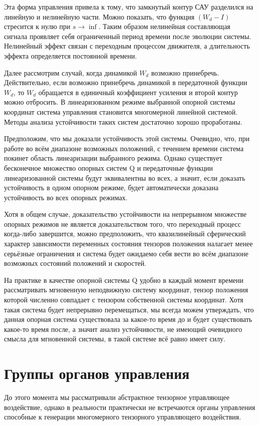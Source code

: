 \documentclass[a4paper]{article}
\begin{document}
Эта форма управления привела к тому, что замкнутый контур САУ разделился на линейную и нелинейную части.
Можно показать, что функция $(W_d - I)$ стресится к нулю при $s \rightarrow \inf$. Таким образом нелинейная составляющая сигнала проявляет себя ограниченный период времени после эволюции системы. Нелинейный эффект связан с переходным процессом движителя, а длительность эффекта определяется постоянной времени.   

Далее рассмотрим случай, когда динамикой $W_d$ возможно принебречь. Действительно, если возможно принебречь динамикой в передаточной функции $W_{d}$, то $W_{d}$ обращается в единичный коэффициент усиления и второй контур можно отбросить. В линеаризованном режиме выбранной опорной системы координат система управления становится многомерной линейной системой. Методы анализа устойчивости таких систем достаточно хорошо проработаны.

Предположим, что мы доказали устойчивость этой системы. Очевидно, что, при работе во всём диапазоне возможных положений, с течением времени система покинет область линеаризации выбранного режима. Однако существует бесконечное множество опорных систем Q и передаточные функции линеаризованной системы будут эквивалентны во всех, а значит, если доказать устойчивость в одном опорном режиме, будет автоматически доказана устойчивость во всех опорных режимах. 

Хотя в общем случае, доказательство устойчивости на непрерывном множестве опорных режимов не является доказательством того, что переходный процесс когда-либо завершится, можно предположить, что квазилинейный сферический характер зависимости переменных состояния тензоров положения налагает менее серьёзные ограничения и система будет ожидаемо себя вести во всём диапазоне возможных состояний положений и скоростей.

На практике в качестве опорной системы Q удобно в каждый момент времени рассматривать мгновенную неподвижную систему координат, тензор положения которой численно совпадает с тензором собственной системы координат. Хотя такая система будет непрерывно перемещаться, мы всегда можем утверждать, что данная опорная система существовала за какое-то время до и будет существовать какое-то время после, а значит анализ устойчивости, не имеющий очевидного смысла для мгновенной системы, в такой системе всё равно имеет силу. 

\section{Группы органов управления}
До этого момента мы рассматривали абстрактное тензорное управляющее воздействие, однако в реальности практически не встречаются органы управления способные к генерации многомерного тензорного управляющего воздействия.
\end{document}
